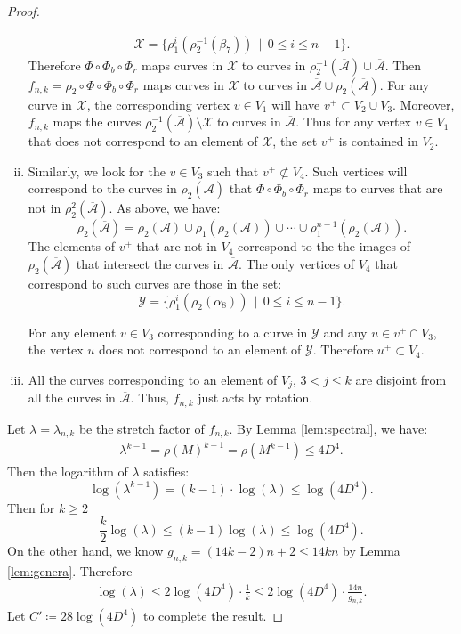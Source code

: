 \begin{proof}
\begin{enumerate}[(i)]
\begin{align*}
    \mathcal{X} = \{ \rho_1^i(\rho_2^{-1}(\beta_7))\,\mid\,0\leq i\leq n-1\}.
  \end{align*}
  Therefore $\Phi\circ\Phi_b\circ\Phi_r$ maps curves in $\mathcal{X}$ to curves in $\rho_2^{-1}(\overline{\mathcal{A}})\cup\overline{\mathcal{A}}$.  Then $f_{n,k}=\rho_2\circ\Phi\circ\Phi_b\circ\Phi_r$ maps curves in $\mathcal{X}$ to curves in $\overline{\mathcal{A}}\cup\rho_2(\overline{\mathcal{A}}).$  
For any curve in $\mathcal{X}$, the corresponding vertex $v\in V_1$ will have
  $v^+ \subset V_2 \cup V_3.$  Moreover, $f_{n,k}$ maps the curves $\rho_2^{-1}(\overline{\mathcal{A}})\setminus \mathcal{X}$ to curves in $\overline{\mathcal{A}}$.  Thus for any vertex $v\in V_1$ that does not correspond to an element of $\mathcal{X}$, the set $v^+$ is contained in $V_2$.
\item  Similarly, we look for the $v \in V_3$ such that $v^+ \not\subset V_4$.  Such vertices will correspond to the curves in $\rho_2(\overline{\mathcal{A}})$ that $\Phi\circ\Phi_b\circ\Phi_r$ maps to curves that are not in $\rho_2^2(\overline{\mathcal{A}})$.  As above, we have: $$\rho_2(\overline{\mathcal{A}})=\rho_2(\mathcal{A})\cup\rho_1(\rho_2(\mathcal{A}))\cup\cdots\cup\rho_1^{n-1}(\rho_2(\mathcal{A})).$$
The elements of $v^+$ that are not in $V_4$ correspond to the the images of $\rho_2(\overline{\mathcal{A}})$ that intersect the curves in $\overline{\mathcal{A}}$.
The only vertices of $V_4$ that correspond to such curves are those in the set:
 $$\mathcal{Y}=\{\rho_1^i(\rho_2(\alpha_8))\,\mid\,0\leq i\leq n-1\}.$$ %



  For any element $v \in V_3$ corresponding to a curve in $\mathcal{Y}$ and any
  $u \in v^+ \cap V_3$, the vertex $u$ does not correspond to an element of $\mathcal{Y}$.  Therefore $u^+ \subset V_4$.
\item All the curves corresponding to an element of $V_j$, $3 < j \leq k$ are disjoint from all the curves in
  $\overline{\mathcal{A}}$. Thus, $f_{n,k}$ just acts by rotation.
\end{enumerate}

Let $\lambda = \lambda_{n,k}$ be the stretch factor of $f_{n,k}$.  By Lemma \ref{lem:spectral}, we have:
\begin{gather*}
    \lambda^{k-1} = \rho(M)^{k-1} = \rho(M^{k-1}) \leq 4D^4.
\end{gather*}
Then the logarithm of $\lambda$ satisfies:
$$\log(\lambda^{k-1})=(k-1)\cdot \log(\lambda) \leq \log(4D^4).$$
Then for $k\geq 2$
    $$\frac{k}{2}\log(\lambda) \leq (k-1)\log(\lambda) \leq \log(4D^4).$$
On the other hand, we know $g_{n,k} = (14k - 2)n + 2 \leq 14kn$ by Lemma \ref{lem:genera}. Therefore
\begin{align*}
    \log(\lambda) \leq 2\log(4D^4)\cdot\frac{1}{k} \leq 2\log(4D^4)\cdot \frac{14n}{g_{n,k}}.
\end{align*}
Let $C' \coloneqq 28\log(4D^4)$ to complete the result.
\end{proof}

